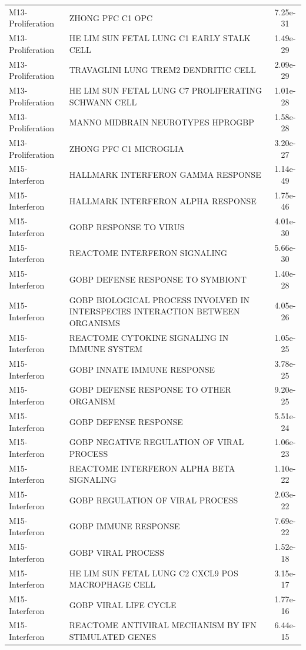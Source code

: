 \documentclass[
]{article}
\begin{document}
\begin{singlespace}
\begin{longtable}[t]{>{\raggedright\arraybackslash}p{1.4in}>{\raggedright\arraybackslash}p{4.5in}c}
M13-Proliferation & ZHONG PFC C1 OPC & 7.25e-31\\
\addlinespace
M13-Proliferation & HE LIM SUN FETAL LUNG C1 EARLY STALK CELL & 1.49e-29\\
M13-Proliferation & TRAVAGLINI LUNG TREM2 DENDRITIC CELL & 2.09e-29\\
M13-Proliferation & HE LIM SUN FETAL LUNG C7 PROLIFERATING SCHWANN CELL & 1.01e-28\\
M13-Proliferation & MANNO MIDBRAIN NEUROTYPES HPROGBP & 1.58e-28\\
M13-Proliferation & ZHONG PFC C1 MICROGLIA & 3.20e-27\\
\addlinespace
M15-Interferon & HALLMARK INTERFERON GAMMA RESPONSE & 1.14e-49\\
M15-Interferon & HALLMARK INTERFERON ALPHA RESPONSE & 1.75e-46\\
M15-Interferon & GOBP RESPONSE TO VIRUS & 4.01e-30\\
M15-Interferon & REACTOME INTERFERON SIGNALING & 5.66e-30\\
M15-Interferon & GOBP DEFENSE RESPONSE TO SYMBIONT & 1.40e-28\\
\addlinespace
M15-Interferon & GOBP BIOLOGICAL PROCESS INVOLVED IN INTERSPECIES INTERACTION BETWEEN ORGANISMS & 4.05e-26\\
M15-Interferon & REACTOME CYTOKINE SIGNALING IN IMMUNE SYSTEM & 1.05e-25\\
M15-Interferon & GOBP INNATE IMMUNE RESPONSE & 3.78e-25\\
M15-Interferon & GOBP DEFENSE RESPONSE TO OTHER ORGANISM & 9.20e-25\\
M15-Interferon & GOBP DEFENSE RESPONSE & 5.51e-24\\
\addlinespace
M15-Interferon & GOBP NEGATIVE REGULATION OF VIRAL PROCESS & 1.06e-23\\
M15-Interferon & REACTOME INTERFERON ALPHA BETA SIGNALING & 1.10e-22\\
M15-Interferon & GOBP REGULATION OF VIRAL PROCESS & 2.03e-22\\
M15-Interferon & GOBP IMMUNE RESPONSE & 7.69e-22\\
M15-Interferon & GOBP VIRAL PROCESS & 1.52e-18\\
\addlinespace
M15-Interferon & HE LIM SUN FETAL LUNG C2 CXCL9 POS MACROPHAGE CELL & 3.15e-17\\
M15-Interferon & GOBP VIRAL LIFE CYCLE & 1.77e-16\\
M15-Interferon & REACTOME ANTIVIRAL MECHANISM BY IFN STIMULATED GENES & 6.44e-15\\

\end{longtable}
\end{singlespace}
\end{document}
